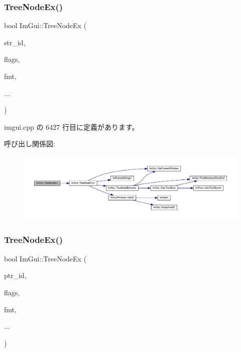 \subsubsection{\texorpdfstring{Tree\+Node\+Ex()}{TreeNodeEx()}\hspace{0.1cm}{\footnotesize\ttfamily [2/3]}}
{\footnotesize\ttfamily bool Im\+Gui\+::\+Tree\+Node\+Ex (\begin{DoxyParamCaption}\item[{const char $\ast$}]{str\+\_\+id,  }\item[{\mbox{\hyperlink{imgui_8h_a0588fdd10c59b49a0159484fe9ec4564}{Im\+Gui\+Tree\+Node\+Flags}}}]{flags,  }\item[{const char $\ast$}]{fmt,  }\item[{}]{... }\end{DoxyParamCaption})}



 imgui.\+cpp の 6427 行目に定義があります。

呼び出し関係図\+:\nopagebreak
\begin{figure}[H]
\begin{center}
\leavevmode
\includegraphics[width=350pt]{namespace_im_gui_a9ca2fae922b38cfddc3259f874c18a5d_cgraph}
\end{center}
\end{figure}
\mbox{\label{namespace_im_gui_adce362ad94baa9b00f5914cbcab00452}} 
\subsubsection{\texorpdfstring{Tree\+Node\+Ex()}{TreeNodeEx()}\hspace{0.1cm}{\footnotesize\ttfamily [3/3]}}
{\footnotesize\ttfamily bool Im\+Gui\+::\+Tree\+Node\+Ex (\begin{DoxyParamCaption}\item[{const void $\ast$}]{ptr\+\_\+id,  }\item[{\mbox{\hyperlink{imgui_8h_a0588fdd10c59b49a0159484fe9ec4564}{Im\+Gui\+Tree\+Node\+Flags}}}]{flags,  }\item[{const char $\ast$}]{fmt,  }\item[{}]{... }\end{DoxyParamCaption})}



